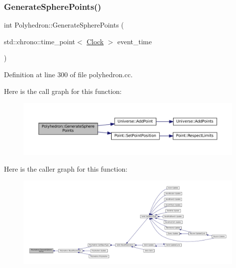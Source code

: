 \subsubsection{\texorpdfstring{Generate\+Sphere\+Points()}{GenerateSpherePoints()}}
{\footnotesize\ttfamily int Polyhedron\+::\+Generate\+Sphere\+Points (\begin{DoxyParamCaption}\item[{std\+::chrono\+::time\+\_\+point$<$ \mbox{\hyperlink{universe_8h_a0ef8d951d1ca5ab3cfaf7ab4c7a6fd80}{Clock}} $>$}]{event\+\_\+time }\end{DoxyParamCaption})}



Definition at line 300 of file polyhedron.\+cc.

Here is the call graph for this function\+:\nopagebreak
\begin{figure}[H]
\begin{center}
\leavevmode
\includegraphics[width=350pt]{class_polyhedron_a15d1cae35ceb6c1ba559928fd417800c_cgraph}
\end{center}
\end{figure}
Here is the caller graph for this function\+:\nopagebreak
\begin{figure}[H]
\begin{center}
\leavevmode
\includegraphics[width=350pt]{class_polyhedron_a15d1cae35ceb6c1ba559928fd417800c_icgraph}
\end{center}
\end{figure}
\mbox{\label{class_polyhedron_a021ec67f2040f8ec26df64e4b9370521}} 
